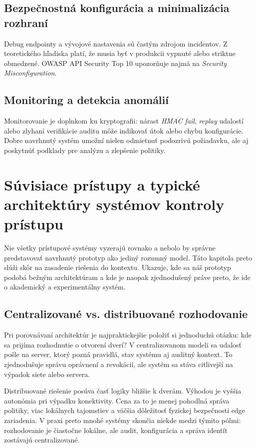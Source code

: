 \documentclass[journal,a4paper,onecolumn]{IEEEtran}
\begin{document}
\subsection{Bezpečnostná konfigurácia a minimalizácia  rozhraní}

Debug endpointy a vývojové nastavenia sú častým zdrojom incidentov. Z teoretického hľadiska platí, že musia byť v produkcii vypnuté alebo striktne obmedzené. OWASP API Security Top 10 upozorňuje najmä na \emph{Security Misconfiguration}.\cite{OWASPAPI2023}

\subsection{Monitoring a detekcia anomálií}

Monitorovanie je doplnkom ku kryptografii: nárast \emph{HMAC fail}, \emph{replay} udalostí alebo zlyhaní verifikácie auditu môže indikovať útok alebo chybu konfigurácie. Dobre navrhnutý systém umožní nielen odmietnuť podozrivú požiadavku, ale aj poskytnúť podklady pre analýzu a zlepšenie politiky.


\section{Súvisiace prístupy a typické architektúry systémov kontroly prístupu}

Nie všetky prístupové systémy vyzerajú rovnako a nebolo by správne predstavovať navrhnutý prototyp ako jediný rozumný model. Táto kapitola preto slúži skôr na zasadenie riešenia do kontextu. Ukazuje, kde sa náš prototyp podobá bežným architektúram a kde je naopak zjednodušený práve preto, že ide o akademický a experimentálny systém.

\subsection{Centralizované vs. distribuované rozhodovanie}

Pri porovnávaní architektúr je najpraktickejšie položiť si jednoduchú otázku: kde sa prijíma rozhodnutie o otvorení dverí? V centralizovanom modeli sa udalosť pošle na server, ktorý pozná pravidlá, stav systému aj auditný kontext. To zjednodušuje správu oprávnení a revokácií, ale systém sa stáva citlivejší na výpadok siete alebo servera.

Distribuované riešenie posúva časť logiky bližšie k dverám. Výhodou je vyššia autonómia pri výpadku konektivity. Cena za to je menej pohodlná správa politiky, viac lokálnych tajomstiev a väčšia dôležitosť fyzickej bezpečnosti edge zariadenia. V praxi preto mnohé systémy skončia niekde medzi týmito pólmi: rozhodovanie je čiastočne lokálne, ale audit, konfigurácia a správa identít zostávajú centralizované.
\end{document}
